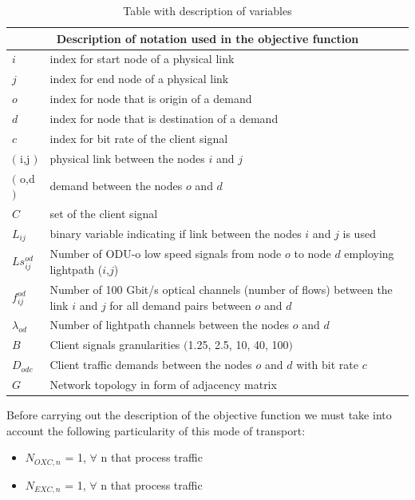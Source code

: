\begin{table}[h!]
\centering
\begin{tabular}{ |p{1cm}||p{13cm}|}
 \hline
 \multicolumn{2}{|c|}{Description of notation used in the objective function} \\
 \hline
 \hline
 $i$ & index for start node of a physical link \\
 $j$ & index for end node of a physical link \\
 $o$ & index for node that is origin of a demand \\
 $d$ & index for node that is destination of a demand \\
 $c$ & index for bit rate of the client signal \\
 $($ i,j $)$ & physical link between the nodes $i$ and $j$ \\
 $($ o,d $)$ & demand between the nodes $o$ and $d$ \\
 $C$ & set of the client signal \\
 $L_{ij}$ & binary variable indicating if link between the nodes $i$ and $j$ is used \\
 $Ls_{ij}^{od}$ & Number of ODU-o low speed signals from node $o$ to node $d$ employing lightpath ($i$,$j$) \\
 $f_{ij}^{od}$ & Number of 100 Gbit/s optical channels (number of flows) between the link $i$ and $j$ for all demand pairs between $o$ and $d$ \\
 $\lambda_{od}$ & Number of lightpath channels between the nodes $o$ and $d$ \\
 $B$ & Client signals granularities $($1.25, 2.5, 10, 40, 100$)$ \\
 $D_{odc}$ & Client traffic demands between the nodes $o$ and $d$ with bit rate $c$ \\
 $G$ & Network topology in form of adjacency matrix \\
 \hline
\end{tabular}
\caption{Table with description of variables}
\label{description_transluc}
\end{table}

Before carrying out the description of the objective function we must take into account the following particularity of this mode of transport:
\begin{itemize}
  \item $N_{OXC,n}$ = 1, \quad $\forall$ n that process traffic
  \item $N_{EXC,n}$ = 1, \quad $\forall$ n that process traffic
\end{itemize}

